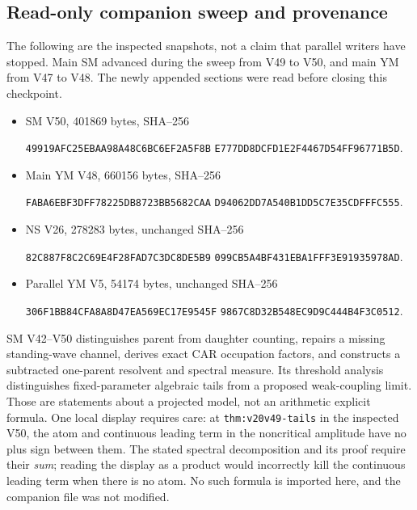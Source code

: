 \documentclass[11pt]{article}
\theoremstyle{definition}
\theoremstyle{remark}
\begin{document}
\subsection{Read-only companion sweep and provenance}

The following are the inspected snapshots, not a claim that parallel
writers have stopped.  Main SM advanced during the sweep from V49 to
V50, and main YM from V47 to V48.  The newly appended sections were
read before closing this checkpoint.
\begin{itemize}
\item SM V50, 401869 bytes, SHA--256
\begin{center}
\texttt{49919AFC25EBAA98A48C6BC6EF2A5F8B}\allowbreak
\texttt{E777DD8DCFD1E2F4467D54FF96771B5D}.
\end{center}
\item Main YM V48, 660156 bytes, SHA--256
\begin{center}
\texttt{FABA6EBF3DFF78225DB8723BB5682CAA}\allowbreak
\texttt{D94062DD7A540B1DD5C7E35CDFFFC555}.
\end{center}
\item NS V26, 278283 bytes, unchanged SHA--256
\begin{center}
\texttt{82C887F8C2C69E4F28FAD7C3DC8DE5B9}\allowbreak
\texttt{099CB5A4BF431EBA1FFF3E91935978AD}.
\end{center}
\item Parallel YM V5, 54174 bytes, unchanged SHA--256
\begin{center}
\texttt{306F1BB84CFA8A8D47EA569EC17E9545F}\allowbreak
\texttt{9867C8D32B548EC9D9C444B4F3C0512}.
\end{center}
\end{itemize}

SM V42--V50 distinguishes parent from daughter counting, repairs a
missing standing-wave channel, derives exact CAR occupation factors,
and constructs a subtracted one-parent resolvent and spectral measure.
Its threshold analysis distinguishes fixed-parameter algebraic tails
from a proposed weak-coupling limit.  Those are statements about a
projected model, not an arithmetic explicit formula.  One local display
requires care: at \texttt{thm:v20v49-tails} in the inspected V50, the
atom and continuous leading term in the noncritical amplitude have no
plus sign between them.  The stated spectral decomposition and its
proof require their \emph{sum}; reading the display as a product would
incorrectly kill the continuous leading term when there is no atom.
No such formula is imported here, and the companion file was not
modified.
\end{document}
